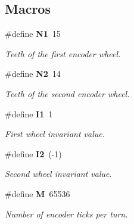 \subsection*{Macros}
\begin{DoxyCompactItemize}
\item 
\mbox{\label{utils_8c_abd7b39be02bc15d79b73e5cf2b531299}} 
\#define \textbf{ N1}~15
\begin{DoxyCompactList}\small\item\em Teeth of the first encoder wheel. \end{DoxyCompactList}\item 
\mbox{\label{utils_8c_acd864640121c7df2c19f61f7baa507e4}} 
\#define \textbf{ N2}~14
\begin{DoxyCompactList}\small\item\em Teeth of the second encoder wheel. \end{DoxyCompactList}\item 
\mbox{\label{utils_8c_ae7dee1f3e548d0fefe0f67c994de03e4}} 
\#define \textbf{ I1}~1
\begin{DoxyCompactList}\small\item\em First wheel invariant value. \end{DoxyCompactList}\item 
\mbox{\label{utils_8c_a964f933e75944a909cc698a3997c8f14}} 
\#define \textbf{ I2}~(-\/1)
\begin{DoxyCompactList}\small\item\em Second wheel invariant value. \end{DoxyCompactList}\item 
\mbox{\label{utils_8c_a52037c938e3c1b126c6277da5ca689d0}} 
\#define \textbf{ M}~65536
\begin{DoxyCompactList}\small\item\em Number of encoder ticks per turn. \end{DoxyCompactList}\end{DoxyCompactItemize}
